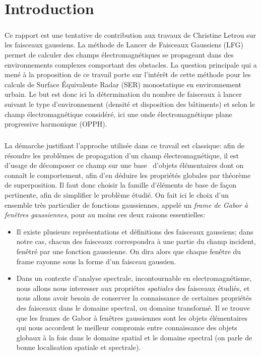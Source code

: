 \section{Introduction}\label{introduction}


\subparagraph{}

  Ce rapport est une tentative de contribution aux travaux de Christine Letrou sur les faisceaux gaussiens.
La méthode de Lancer de Faisceaux Gaussiens (LFG) permet de calculer des champs électromagnétiques se propageant
dans des environnements complexes comportant des obstacles.
La question principale qui a mené à la proposition de ce travail porte sur l'intérêt de cette méthode pour les calculs
de Surface Équivalente Radar (SER) monostatique en environnement urbain.
Le but est donc ici la détermination du nombre de faisceaux à lancer suivant le type d’environnement
(densité et disposition des bâtiments) et selon le champ électromagnétique considéré, ici
une onde électromagnétique plane progressive harmonique (OPPH).


\subparagraph{}

La démarche justifiant l'approche utilisée dans ce travail est classique: afin de résoudre les problèmes de propagation
d'un champ électromagnétique, il est d’usage de décomposer ce champ sur une \og base \fg\ d’objets élémentaires
dont on connaît le comportement, afin d’en déduire les propriétés globales par théorème de superposition.
Il faut donc choisir la famille d'éléments de base de façon pertinente, afin de simplifier le problème étudié.
On fait ici le choix d'un ensemble très particulier de fonctions gaussiennes,
appelé un \emph{frame de Gabor à fenêtres gaussiennes}, pour au moins ces deux raisons essentielles:

\begin{itemize}

 \item Il existe plusieurs représentations et définitions des faisceaux gaussiens; dans notre cas,
chacun des faisceaux correspondra à une partie du champ incident, fenêtré par une fonction gaussienne.
On dira alors que chaque fenêtre du frame rayonne sous la forme d'un faisceau gaussien.

\item Dans un contexte d'analyse spectrale, incontournable en electromagnétisme,
 nous allons nous interesser aux propriétes \emph{spatiales} des faisceaux étudiés, et nous allons avoir besoin de
 conserver la connaissance de certaines propriétés des faisceaux dans le domaine spectral, ou domaine transformé.
 Il se trouve que les frames de Gabor à fenêtres gaussiennes sont les objets élémentaires qui nous accordent le meilleur
 compromis entre connaissance des objets globaux à la fois dans le domaine spatial et le domaine spectral 
 (on parle de bonne localisation spatiale et spectrale).
 
\end{itemize}

